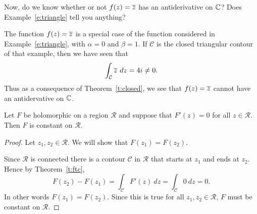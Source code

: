 \begin{question}
Now, do we know whether or not $f(z)=\overline{z}$ has an antiderivative on $\mathbb{C}$?  Does Example~\ref{e:triangle} tell you anything?
\end{question}
\begin{answer}
 The function $f(z) = \overline{z}$ is a special case of the function considered in Example~\ref{e:triangle}, with $\alpha =0$ and $\beta =1$.  If $\mathcal{C}$ is the closed triangular contour of that example, then we have seen that
\[
\int_{\mathcal{C}}  \overline{z}\ dz = 4i \neq 0.
\]
Thus as a consequence of Theorem~\ref{t:closed}, we see that $f(z)=\overline{z}$ cannot have an antidervative on $\mathbb{C}$.
\end{answer}
\begin{theorem}
Let $F$ be holomorphic on a region $\mathcal{R}$ and suppose that $F'(z)=0$ for all $z \in \mathcal{R}$.  Then $F$ is constant on $\mathcal{R}$.
\end{theorem}
\begin{proof}
Let $z_1,z_2 \in \mathcal{R}$.  We will show that $F(z_1)=F(z_2)$.

Since $\mathcal{R}$ is connected there is a contour $\mathcal{C}$ in $\mathcal{R}$ that starts at $z_1$ and ends at $z_2$.  Hence by Theorem~\ref{t:ftc},
\[
F(z_2)-F(z_1) = \int_{\mathcal{C}} F'(z)\ dz = \int_{\mathcal{C}} 0\ dz = 0.
\]
In other words $F(z_1)=F(z_2)$.  Since this is true for all $z_1,z_2 \in \mathcal{R}$, $F$ must be constant on $\mathcal{R}$.
\end{proof}

